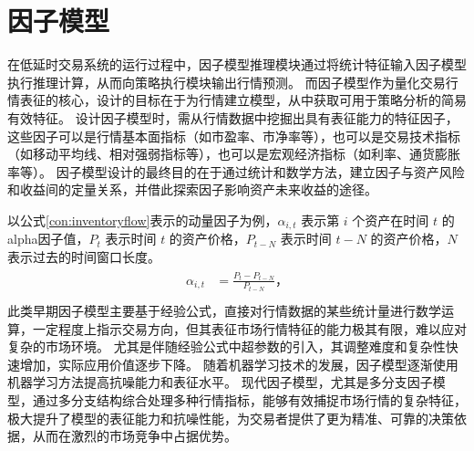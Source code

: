 \section{因子模型}

在低延时交易系统的运行过程中，因子模型推理模块通过将统计特征输入因子模型执行推理计算，从而向策略执行模块输出行情预测。
而因子模型作为量化交易行情表征的核心，设计的目标在于为行情建立模型，从中获取可用于策略分析的简易有效特征。
设计因子模型时，需从行情数据中挖掘出具有表征能力的特征因子，这些因子可以是行情基本面指标（如市盈率、市净率等），也可以是交易技术指标（如移动平均线、相对强弱指标等），也可以是宏观经济指标（如利率、通货膨胀率等）。
因子模型设计的最终目的在于通过统计和数学方法，建立因子与资产风险和收益间的定量关系，并借此探索因子影响资产未来收益的途径。


以公式\ref{con:inventoryflow}表示的动量因子为例，$\alpha_{i,t}$ 表示第 $i$ 个资产在时间 $t$ 的alpha因子值，$P_{t}$ 表示时间 $t$ 的资产价格，$P_{t-N}$ 表示时间 $t-N$ 的资产价格，$N$ 表示过去的时间窗口长度。
\begin{align}
    \begin{split}
        \alpha_{i,t} &= \frac{P_{t} - P_{t-N}}{P_{t-N}}， \\
    \label{con:inventoryflow}
    \end{split}
\end{align}
此类早期因子模型主要基于经验公式，直接对行情数据的某些统计量进行数学运算，一定程度上指示交易方向，但其表征市场行情特征的能力极其有限，难以应对复杂的市场环境。
尤其是伴随经验公式中超参数的引入，其调整难度和复杂性快速增加，实际应用价值逐步下降。
随着机器学习技术的发展，因子模型逐渐使用机器学习方法提高抗噪能力和表征水平。
现代因子模型，尤其是多分支因子模型，通过多分支结构综合处理多种行情指标，能够有效捕捉市场行情的复杂特征，极大提升了模型的表征能力和抗噪性能，为交易者提供了更为精准、可靠的决策依据，从而在激烈的市场竞争中占据优势。

